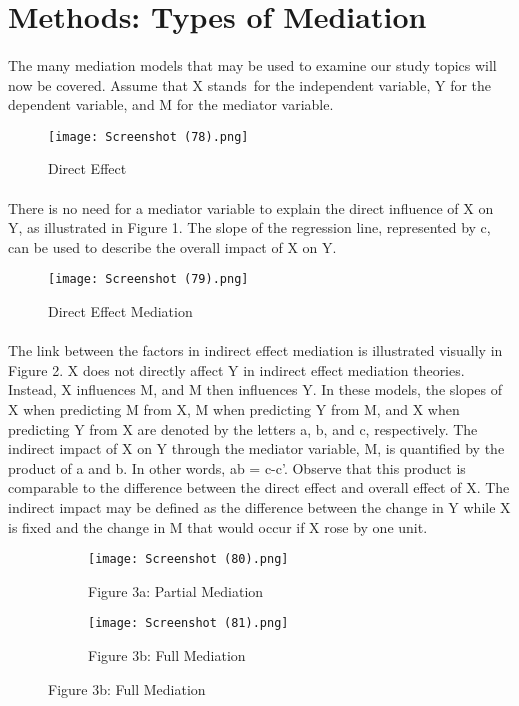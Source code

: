 \documentclass[12pt]{report}
\begin{document}
\section*{Methods: Types of Mediation}
\paragraph{}
The many mediation models that may be used to examine our study topics will now be covered. Assume that X stands for the independent variable, Y for the dependent variable, and M for the mediator variable. \cite{goforth2015university}
\begin{figure}[H]
    \centering
    \texttt{[image: Screenshot (78).png]}
    \caption{Direct Effect}
    \label{fig:Figure 1}
\end{figure}

\paragraph{}

There is no need for a mediator variable to explain the direct influence of X on Y, as illustrated in Figure 1. The slope of the regression line, represented by c, can be used to describe the overall impact of X on Y.
\begin{figure}[H]
    \centering
    \texttt{[image: Screenshot (79).png]}
    \caption{Direct Effect Mediation}
    \label{fig:Figure 2}
\end{figure}

\paragraph{}
The link between the factors in indirect effect mediation is illustrated visually in Figure 2. X does not directly affect Y in indirect effect mediation theories. Instead, X influences M, and M then influences Y. In these models, the slopes of X when predicting M from X, M when predicting Y from M, and X when predicting Y from X are denoted by the letters a, b, and c, respectively. The indirect impact of X on Y through the mediator variable, M, is quantified by the product of a and b. In other words, ab = c-c'. Observe that this product is comparable to the difference between the direct effect and overall effect of X. The indirect impact may be defined as the difference between the change in Y while X is fixed and the change in M that would occur if X rose by one unit.
\begin{figure}[H]
  \begin{subfigure}[b]{0.4\textwidth}
     \texttt{[image: Screenshot (80).png]}
    \caption{Figure 3a: Partial Mediation}
    \label{fig:f1}
  \end{subfigure}
  \hfill
  \begin{subfigure}[b]{0.4\textwidth}
    \texttt{[image: Screenshot (81).png]}
    \caption{Figure 3b: Full Mediation}
    \label{fig:f2}
  \end{subfigure}
  \label{fig:Figure 3}
\end{figure}
\end{document}
